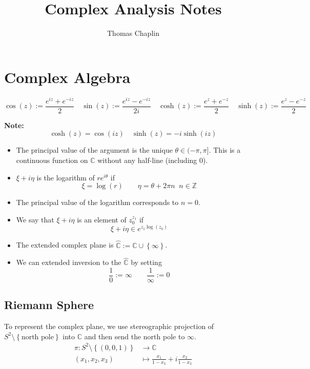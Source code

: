 \documentclass[11pt]{article}
\title{Complex Analysis Notes}
\author{Thomas Chaplin}
\date{}
\newcommand{\defeq}{:=}
\newcommand{\C}{\mathbb{C}}
\newcommand{\Z}{\mathbb{Z}}
\newenvironment{defin}
	{\begin{mdframed}[backgroundcolor=white, roundcorner=5pt, linewidth=1pt]}
	{\end{mdframed}}
\newcommand{\mdf}[1]{{\color{red} #1}}
\newenvironment{note}
	{\begin{mdframed}[backgroundcolor=white, linecolor=red, roundcorner=5pt, linewidth=1pt]\bfseries{Note:}\normalfont}
	{\end{mdframed}}
\begin{document}
\maketitle
\tableofcontents
\newpage

\section{Complex Algebra}
\[
	\cos(z)\defeq \frac{e^{iz}+e^{-iz}}{2} \quad
	\sin(z)\defeq \frac{e^{iz}-e^{-iz}}{2i} \quad
	\cosh(z)\defeq \frac{e^{z}+e^{-z}}{2} \quad
	\sinh(z)\defeq \frac{e^{z}-e^{-z}}{2}
\]

\begin{note}
	\[
		\cosh(z) = \cos(iz) \quad
		\sinh(z) = -i\sinh(iz)
	\]
\end{note}

\begin{defin}
	\begin{itemize}
		\item The \mdf{principal value of the argument} is the unique $\theta\in (-\pi, \pi]$.	
			This is a continuous function on $\C$ without any half-line (including $0$). 
		\item $\xi + i \eta$ is the \mdf{logarithm} of $re^{i\theta}$ if
			\[
				\xi = \log(r) \quad\quad \eta = \theta + 2\pi n \;\; n\in \Z
			\]
		\item The \mdf{principal value of the logarithm} corresponds to $n=0$.
		\item We say that $\xi+ i \eta$ is an element of $z_0^{z_1}$ if
			\[
				\xi + i \eta \in e^{z_1\log(z_0)}
			\]
		\item The \mdf{extended complex plane} is $\hat{\C}\defeq \C \cup \left\{\infty\right\}$.
		\item We can extended inversion to the $\hat{\C}$ by setting
		\[
			\frac{1}{0}\defeq\infty \quad\quad \frac{1}{\infty}\defeq 0
		\]
	\end{itemize}
\end{defin}

\subsection{Riemann Sphere}
To represent the complex plane, we use stereographic projection of $S^2\setminus\left\{\text{north pole}\right\}$ into $\C$ and then send the north pole to $\infty$.
\begin{align*}
	\pi:S^2\setminus\left\{(0,0,1)\right\}&\to \C \\
	(x_1, x_2, x_3) &\mapsto \frac{x_1}{1-x_3}+i\frac{x_2}{1-x_3}
\end{align*}
\end{document}
